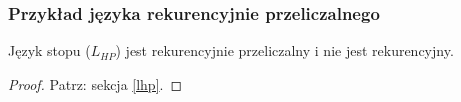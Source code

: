 \subsubsection{Przykład języka rekurencyjnie przeliczalnego}

\begin{theorem}
    Język stopu (\(L_{HP}\)) jest rekurencyjnie przeliczalny i nie jest rekurencyjny. 
\end{theorem}
\begin{proof}
    Patrz: sekcja \ref{lhp}.
\end{proof}